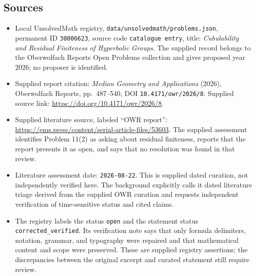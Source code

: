 \documentclass[11pt]{article}
\begin{document}
\subsection{Sources}
\begin{itemize}
\item Local UnsolvedMath registry, \texttt{data/unsolvedmath/problems.json}, permanent ID \texttt{30006623}, source code \texttt{catalogue entry}, title: \emph{Cubulability and Residual Finiteness of Hyperbolic Groups}. The supplied record belongs to the Oberwolfach Reports Open Problems collection and gives proposed year 2026; no proposer is identified.
\item Supplied report citation: \emph{Median Geometry and Applications} (2026), Oberwolfach Reports, pp.\ 487--540, DOI \texttt{10.4171/owr/2026/8}. Supplied source link: \url{https://doi.org/10.4171/owr/2026/8}.
\item Supplied literature source, labeled ``OWR report'': \url{https://ems.press/content/serial-article-files/53603}. The supplied assessment identifies Problem 11(2) as asking about residual finiteness, reports that the report presents it as open, and says that no resolution was found in that review.
\item Literature assessment date: \texttt{2026-08-22}. This is supplied dated curation, not independently verified here. The background explicitly calls it dated literature triage derived from the supplied OWR curation and requests independent verification of time-sensitive status and cited claims.
\item The registry labels the status \texttt{open} and the statement status \texttt{corrected\_verified}. Its verification note says that only formula delimiters, notation, grammar, and typography were repaired and that mathematical content and scope were preserved. These are supplied registry assertions; the discrepancies between the original excerpt and curated statement still require review.
\end{itemize}
\end{document}
